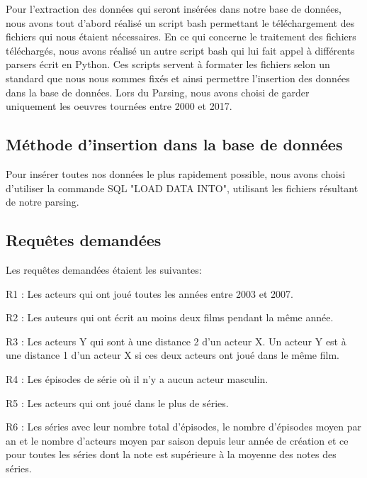 \documentclass[10pt,a4paper]{article}
\begin{document}
Pour l'extraction des données qui seront insérées dans notre base de données, nous avons tout d'abord réalisé un script bash permettant le téléchargement des fichiers qui nous étaient nécessaires. En ce qui concerne le traitement des fichiers téléchargés, nous avons réalisé un autre script bash qui lui fait appel à différents parsers écrit en Python. Ces scripts servent à formater les fichiers selon un standard que nous nous sommes fixés et ainsi permettre l'insertion des données dans la base de données. Lors du Parsing, nous avons choisi de garder uniquement les oeuvres tournées entre 2000 et 2017.

\subsection{Méthode d'insertion dans la base de données}

Pour insérer toutes nos données le plus rapidement possible, nous avons choisi d'utiliser la commande SQL "LOAD DATA INTO", utilisant les fichiers résultant de notre parsing.


\subsection{Requêtes demandées}
Les requêtes demandées étaient les suivantes:
\begin{list}{-}{}
  \item R1 : Les acteurs qui ont joué toutes les années entre 2003 et
    2007.
  \item R2 : Les auteurs qui ont écrit au moins deux films pendant la
    même année.
  \item R3 : Les acteurs Y qui sont à une distance 2 d'un acteur X. Un
    acteur Y est à une distance 1 d'un acteur X si ces deux acteurs
    ont joué dans le même film.
  \item R4 : Les épisodes de série où il n'y a aucun acteur masculin.
  \item R5 : Les acteurs qui ont joué dans le plus de séries.
  \item R6 : Les séries avec leur nombre total d'épisodes, le nombre
    d'épisodes moyen par an et le nombre d'acteurs moyen par saison
    depuis leur année de création et ce pour toutes les séries dont la
    note est supérieure à la moyenne des notes des séries.
\end{list}
\end{document}
